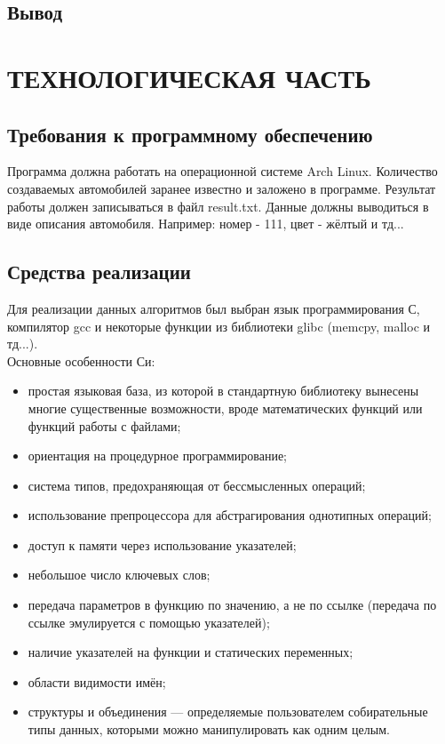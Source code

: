 \documentclass[a4paper,12pt]{article}
\begin{document}
\subsection{Вывод}

\newpage
\section{ТЕХНОЛОГИЧЕСКАЯ ЧАСТЬ}
\subsection{Требования к программному обеспечению}
Программа должна работать на операционной системе Arch Linux. Количество создаваемых автомобилей заранее известно и заложено в программе. Результат работы должен записываться в файл result.txt. Данные должны выводиться в виде описания автомобиля. Например: номер - 111, цвет - жёлтый и тд...

\newpage
\subsection{Средства реализации}
Для реализации данных алгоритмов был выбран язык программирования С, компилятор gcc и некоторые функции из библиотеки glibc (memcpy, malloc и тд...). \\
Основные особенности Си:
\begin{itemize}
\item простая языковая база, из которой в стандартную библиотеку вынесены многие существенные возможности, вроде математических функций или функций работы с файлами;
\item ориентация на процедурное программирование;
\item система типов, предохраняющая от бессмысленных операций;
\item использование препроцессора для абстрагирования однотипных операций;
\item доступ к памяти через использование указателей;
\item небольшое число ключевых слов;
\item передача параметров в функцию по значению, а не по ссылке (передача по ссылке эмулируется с помощью указателей);
\item наличие указателей на функции и статических переменных;
\item области видимости имён;
\item структуры и объединения — определяемые пользователем собирательные типы данных, которыми можно манипулировать как одним целым.
\end{itemize}
\end{document}
